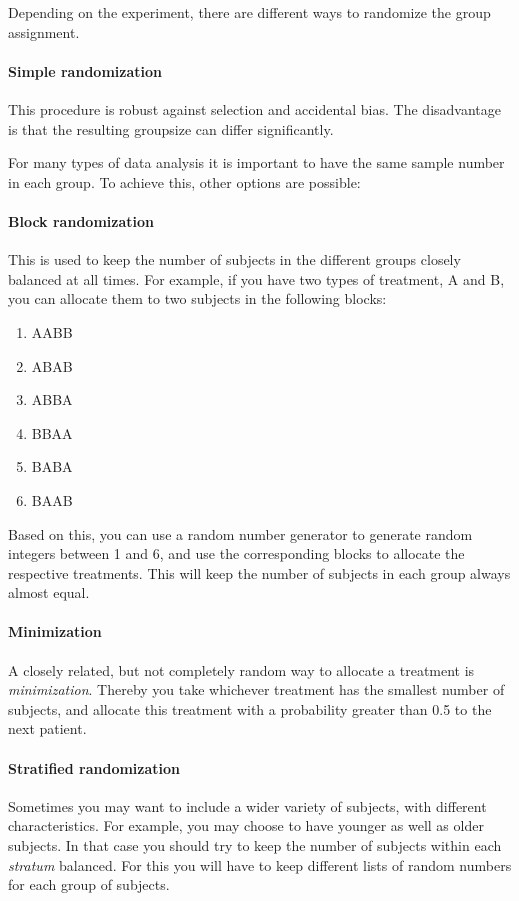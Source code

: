 Depending on the experiment, there are different ways to randomize the group assignment.

\paragraph{Simple randomization}
This procedure is robust against selection and accidental bias. The disadvantage is that the resulting groupsize can differ significantly.

For many types of data analysis it is important to have the same sample number in each group. To achieve this, other options are possible:

\paragraph{Block randomization}
This is used to keep the number of subjects in the different groups closely balanced at all times. For example, if you have two types of treatment, A and B, you can allocate them to two subjects in the following blocks:

\begin{enumerate}
  \item AABB
  \item ABAB
  \item ABBA
  \item BBAA
  \item BABA
  \item BAAB
\end{enumerate}

Based on this, you can use a random number generator to generate random integers between 1 and 6, and use the corresponding blocks to allocate the respective treatments. This will keep the number of subjects in each group always almost equal.

\paragraph{Minimization}
A closely related, but not completely random way to allocate a treatment is \emph{minimization}. Thereby you take whichever treatment has the smallest number of subjects, and allocate this treatment with a probability greater than 0.5 to the next patient.

\paragraph{Stratified randomization}
Sometimes you may want to include a wider variety of subjects, with different characteristics. For example, you may choose to have younger as well as older subjects. In that case you should try to keep the number of subjects within each \emph{stratum} balanced. For this you will have to keep different lists of random numbers for each group of subjects.

